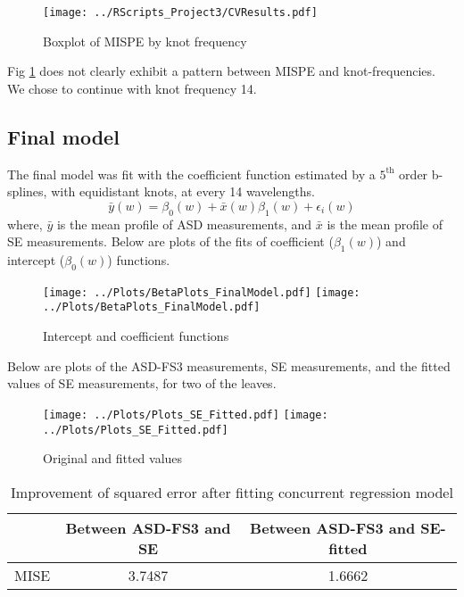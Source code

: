 \begin{figure}[H]
\centering
\texttt{[image: ../RScripts\_Project3/CVResults.pdf]}
\caption{Boxplot of MISPE by knot frequency}
\label{fig:Fig3.1}
\end{figure}

Fig \ref{fig:Fig3.1} does not clearly exhibit a pattern between MISPE and knot-frequencies. We chose to continue with knot frequency 14. 

\subsection*{Final model}
The final model was fit with the coefficient function estimated by a $5^{\text{th}}$ order b-splines, with equidistant knots, at every 14 wavelengths. 
\begin{equation}
\bar{y}(w) = \beta_0(w) + \bar{x}(w) \beta_1(w) + \epsilon_i(w) 
\label{eq:Eq3.2}
\end{equation} 
where, $\bar{y}$ is the mean profile of ASD measurements, and $\bar{x}$ is the mean profile  of SE measurements. Below are plots of the fits of coefficient ($\beta_1(w)$) and intercept ($\beta_0(w)$) functions.

\begin{figure}[H]
\centering
\texttt{[image: ../Plots/BetaPlots\_FinalModel.pdf]}
\hspace{0.5cm}
\texttt{[image: ../Plots/BetaPlots\_FinalModel.pdf]}
\caption{Intercept and coefficient functions}
\label{fig:Fig3.2}
\end{figure}

Below are plots of the ASD-FS3 measurements, SE measurements, and the fitted values of SE measurements, for two of the leaves.
\begin{figure}[H]
\centering
\texttt{[image: ../Plots/Plots\_SE\_Fitted.pdf]}
\hspace{0.5cm}
\texttt{[image: ../Plots/Plots\_SE\_Fitted.pdf]}
\caption{Original and fitted values}
\label{fig:Fig3.3}
\end{figure}

\begin{table}[H]
\centering
\begin{tabular}{c|c|c}
\hline
& Between ASD-FS3 and SE & Between ASD-FS3 and SE-fitted \\
\hline
MISE & 3.7487 & 1.6662 \\
\hline
\end{tabular}
\caption{Improvement of squared error after fitting concurrent regression model}
\label{tab:tab3.1}
\end{table}

